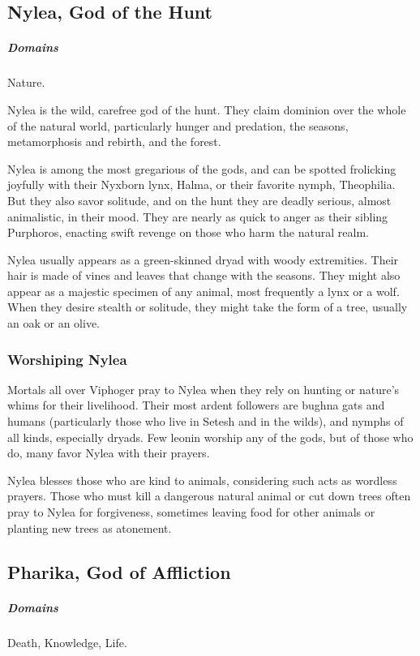 \subsection*{Nylea, God of the Hunt} \label{ssec::nylea}
    \subparagraph{Domains} Nature.

    Nylea is the wild, carefree god of the hunt.
    They claim dominion over the whole of the natural world, particularly hunger and predation, the seasons, metamorphosis and rebirth, and the forest.

    Nylea is among the most gregarious of the gods, and can be spotted frolicking joyfully with their Nyxborn lynx, Halma, or their favorite nymph, Theophilia.
    But they also savor solitude, and on the hunt they are deadly serious, almost animalistic, in their mood.
    They are nearly as quick to anger as their sibling Purphoros, enacting swift revenge on those who harm the natural realm.

    Nylea usually appears as a green-skinned dryad with woody extremities.
    Their hair is made of vines and leaves that change with the seasons.
    They might also appear as a majestic specimen of any animal, most frequently a lynx or a wolf.
    When they desire stealth or solitude, they might take the form of a tree, usually an oak or an olive.

    \subsubsection{Worshiping Nylea}
        Mortals all over Viphoger pray to Nylea when they rely on hunting or nature's whims for their livelihood.
        Their most ardent followers are bughna gats and humans (particularly those who live in Setesh and in the wilds), and nymphs of all kinds, especially dryads.
        Few leonin worship any of the gods, but of those who do, many favor Nylea with their prayers.

        Nylea blesses those who are kind to animals, considering such acts as wordless prayers.
        Those who must kill a dangerous natural animal or cut down trees often pray to Nylea for forgiveness, sometimes leaving food for other animals or planting new trees as atonement.

\subsection*{Pharika, God of Affliction} \label{ssec::pharika}
    \subparagraph{Domains} Death, Knowledge, Life.

